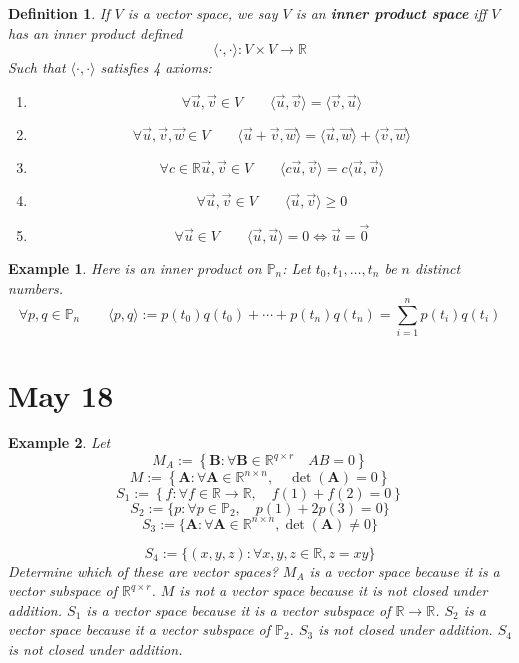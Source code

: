 \documentclass[11pt]{article}
\newtheorem{defn}{Definition}
\newtheorem{ex}{Example}
\begin{document}
\begin{defn}
  If $V$ is a vector space, we say $V$ is an \textbf{inner product space} iff $V$ has an inner product defined
  \[\langle \cdot,\cdot \rangle : V \times V \to \mathbb{R}\]
  Such that $\langle \cdot ,\cdot \rangle$ satisfies 4 axioms:
  \begin{enumerate}
          \item \[\forall \vec{u}, \vec{v} \in V \qquad \langle \vec{u}, \vec{v} \rangle = \langle \vec{v}, \vec{u} \rangle\]
          \item \[\forall \vec{u}, \vec{v}, \vec{w} \in V \qquad \langle \vec{u} + \vec{v}, \vec{w} \rangle = \langle \vec{u} , \vec{w} \rangle + \langle \vec{v} , \vec{w} \rangle\]
          \item \[\forall c\in \mathbb{R} \vec{u}, \vec{v} \in V \qquad \langle c\vec{u} , \vec{v}\rangle = c\langle \vec{u}, \vec{v} \rangle\]
    \item \[\forall \vec{u}, \vec{v} \in V \qquad \langle \vec{u}, \vec{v} \rangle \ge 0\]
        \item \[\forall \vec{u } \in V \qquad \langle \vec{u}, \vec{u} \rangle = 0 \iff \vec{u} = \vec{0}\]
  \end{enumerate}
\end{defn}

\begin{ex}
  Here is an inner product on $\mathbb{P}_{n}$: Let $t_{0}, t_{1}, \ldots, t_{n}$  be $n$ distinct numbers.
  \[\forall p,q \in \mathbb{P}_{n} \qquad \langle p , q \rangle := p(t_{0})q(t_{0})+\cdots +p(t_{n})q(t_{n}) = \sum_{i=1}^{n}p(t_{i})q(t_{i})\]
\end{ex}
\section{May 18}

\begin{ex}
  Let
  \[M_{A} := \left\{ \mathbf{B}  : \forall \mathbf{B} \in \mathbb{R}^{q \times r}  \quad AB = 0\right\}\]
  \[M := \left\{\mathbf{A} : \forall \mathbf{A} \in \mathbb{R}^{n \times n} , \quad \det(\mathbf{A}) = 0\right\}\]
  \[S_{1} := \left\{ f : \forall f \in \mathbb{R} \to \mathbb{R}, \quad f(1) + f(2) = 0\right\}\]
  \[S_{2} := \{p : \forall p \in \mathbb{P}_{2} , \quad p(1) + 2p(3) = 0\}\]
  \[S_{3} := \{\mathbf{A} : \forall \mathbf{A} \in \mathbb{R}^{n \times n} , \det(\mathbf{A}) \neq 0\}\]

  \[S_{4} := \{(x,y,z) : \forall x,y,z \in \mathbb{R} , z = xy\}\]
  Determine which of these are vector spaces?
  $M_{A}$ is a vector space because it is a vector subspace of $\mathbb{R}^{q \times r}$.
  $M$ is not a vector space because it is not closed under addition.
  $S_{1}$ is a vector space because it is a vector subspace of $\mathbb{R} \to \mathbb{R}$.
  $S_{2}$ is a vector space because it a vector subspace of $\mathbb{P}_{2}$.
  $S_{3}$ is not closed under addition.
  $S_{4}$ is not closed under addition.
\end{ex}
\end{document}
